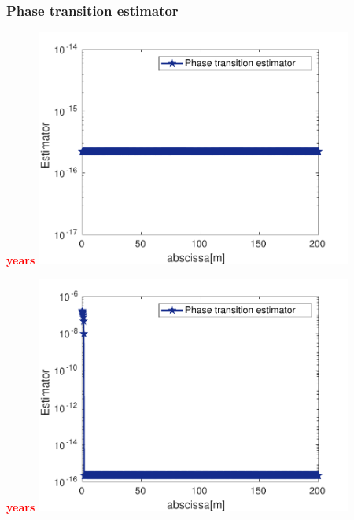 \documentclass[10 pt]{beamer}
\begin{document}
\begin{frame}
\frametitle{Phase transition estimator}
\begin{minipage}{0.49\textwidth}
\centering
\scriptsize{\textcolor{red}{\textbf{ years}}}
\includegraphics[width=0.78\textwidth]{image/MODIF_phase_transition_estimator_appearance_gas_nt=inittime_cv}
\end{minipage}
\hfill
\begin{minipage}{0.49\textwidth}
\centering
\scriptsize{\textcolor{red}{ \textbf{ years}}} 
\includegraphics[width=0.78\textwidth]{image/MODIF_phase_transition_estimator_appearance_gas_nt=2_cv}
\end{minipage}


\end{frame}
\end{document}
